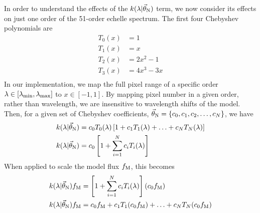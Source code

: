 \documentclass[preprint]{aastex} %
\newcommand{\vt}{\vec{\theta}}
\newcommand{\vN}{\vt_{\rm N}}
\newcommand{\fM}{f_{\rm M}}
\begin{document}
In order to understand the effects of the $k(\lambda | \vN)$ term, we now consider its effects on just one order of the 51-order echelle spectrum. The first four Chebyshev polynomials are 
\begin{align*}
  T_0(x) &= 1\\
  T_1(x) &= x\\
  T_2(x) &= 2 x^2 - 1\\
  T_3(x) &= 4 x^3 - 3x\\
\end{align*}
In our implementation, we map the full pixel range of a specific order $\lambda \in [\lambda_{\rm min}, \lambda_{\rm max}]$ to $x \in [-1, 1]$. By mapping pixel number in a given order, rather than wavelength, we are insensitive to wavelength shifts of the model. Then, for a given set of Chebyshev coefficients, $\vN = \{ c_0, c_1, c_2, \ldots, c_N \}$, we have 
\begin{align}
  k(\lambda | \vN) &= c_0 T_0(\lambda) \left [1 + c_1 T_1(\lambda) + \ldots + c_N T_N(\lambda) \right ]\\
  k(\lambda | \vN) &= c_0 \left [1 + \sum^N_{i = 1} c_i T_i(\lambda) \right ]
  \label{eqn:k_new}
\end{align}
When applied to scale the model flux $\fM$, this becomes
\begin{align}
  k(\lambda | \vN) \fM &=  \left [1 + \sum^N_{i = 1} c_i T_i(\lambda) \right ] (c_0 \fM)\\
  k(\lambda | \vN) \fM &= c_0 \fM + c_1 T_1 (c_0 \fM) + \ldots + c_N T_N (c_0 \fM)
\end{align}
\end{document}

